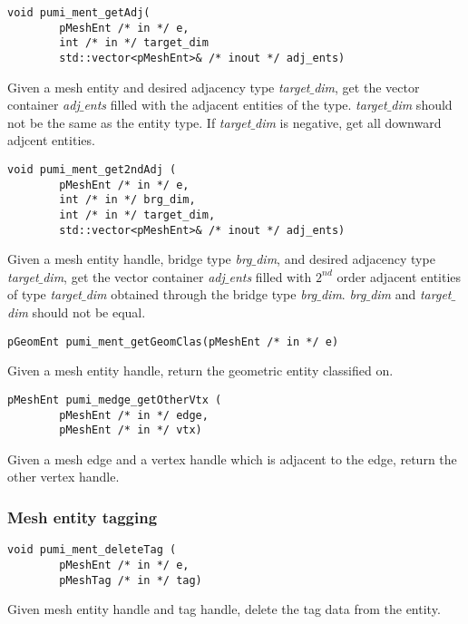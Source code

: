 \begin{verbatim}
void pumi_ment_getAdj(
        pMeshEnt /* in */ e,
        int /* in */ target_dim
        std::vector<pMeshEnt>& /* inout */ adj_ents)
\end{verbatim}\vspace{-.5cm}\hspace{1cm}
        Given a mesh entity and desired adjacency type \emph{target$\_$dim}, get the vector container \emph{adj$\_$ents} filled with the adjacent entities of the type. \emph{target$\_$dim} should not be the same as the entity type. If \emph{target$\_$dim} is negative, get all downward adjcent entities.

\begin{verbatim}
void pumi_ment_get2ndAdj (
        pMeshEnt /* in */ e,
        int /* in */ brg_dim,
        int /* in */ target_dim,
        std::vector<pMeshEnt>& /* inout */ adj_ents)
\end{verbatim}\vspace{-.5cm}\hspace{1cm}
        Given a mesh entity handle, bridge type \emph{brg$\_$dim}, and desired adjacency type \emph{target$\_$dim}, get the vector container \emph{adj$\_$ents} filled with $2^{nd}$ order adjacent entities of type \emph{target$\_$dim} obtained through the bridge type \emph{brg$\_$dim}. \emph{brg$\_$dim} and \emph{target$\_$dim} should not be equal.

\begin{verbatim}
pGeomEnt pumi_ment_getGeomClas(pMeshEnt /* in */ e)
\end{verbatim}\vspace{-.5cm}\hspace{1cm}
	Given a mesh entity handle, return the geometric entity classified on. 

\begin{verbatim}
pMeshEnt pumi_medge_getOtherVtx (
        pMeshEnt /* in */ edge, 
        pMeshEnt /* in */ vtx)
\end{verbatim}\vspace{-.5cm}\hspace{1cm}
Given a mesh edge and a vertex handle which is adjacent to the edge, return the other vertex handle.

\subsubsection{Mesh entity tagging}
\begin{verbatim}
void pumi_ment_deleteTag (
        pMeshEnt /* in */ e, 
        pMeshTag /* in */ tag)
\end{verbatim}\vspace{-.5cm}\hspace{1cm}
Given mesh entity handle and tag handle, delete the tag data from the entity.

